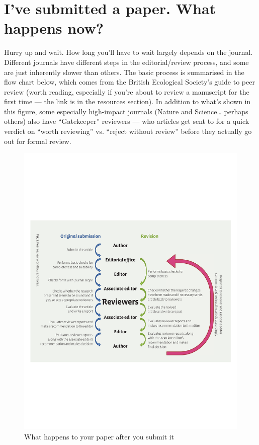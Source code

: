 \documentclass[11pt,]{article}
\author{}
\date{}
\begin{document}
\section{I've submitted a paper. What happens
now?}\label{ive-submitted-a-paper.-what-happens-now}

Hurry up and wait. How long you'll have to wait largely depends on the
journal. Different journals have different steps in the editorial/review
process, and some are just inherently slower than others. The basic
process is summarised in the flow chart below, which comes from the
British Ecological Society's guide to peer review (worth reading,
especially if you're about to review a manuscript for the first time ---
the link is in the resources section). In addition to what's shown in
this figure, some especially high-impact journals (Nature and
Science\ldots{} perhaps others) also have ``Gatekeeper'' reviewers ---
who articles get sent to for a quick verdict on ``worth reviewing'' vs.
``reject without review'' before they actually go out for formal review.

\begin{figure}[htbp]
\centering
\includegraphics{BES_publishing_flowchart.pdf}
\caption{What happens to your paper after you submit it}
\end{figure}
\end{document}
